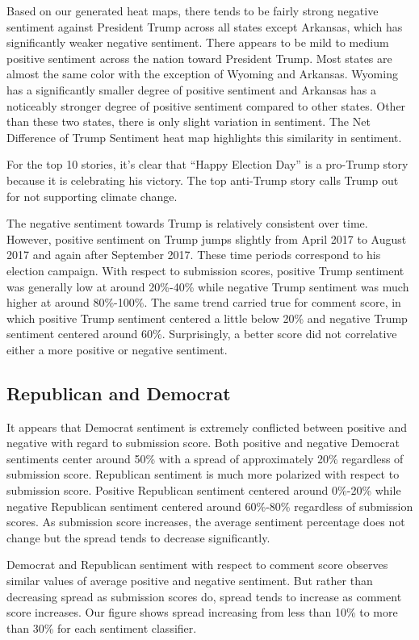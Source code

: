 \documentclass[12pt]{article}
\begin{document}
Based on our generated heat maps, there tends to be fairly strong negative sentiment against President
Trump across all states except Arkansas, which has significantly weaker negative sentiment.
There appears to be mild to medium positive sentiment across the nation toward President
Trump. Most states are almost the same color with the exception of Wyoming and Arkansas. Wyoming has a
significantly smaller degree of positive sentiment and Arkansas has a noticeably stronger degree of positive
sentiment compared to other states. Other than these two states, there is only slight variation in sentiment.
The Net Difference of Trump Sentiment heat map highlights this similarity in sentiment.

For the top 10 stories, it’s clear that ``Happy Election Day'' is a pro-Trump story because it is celebrating
his victory. The top anti-Trump story calls Trump out for not supporting climate change.

The negative sentiment towards Trump is relatively consistent over time. However, positive sentiment on Trump jumps slightly
from April 2017 to August 2017 and again after September 2017. These time periods correspond to his election campaign.
With respect to submission scores, positive Trump sentiment was generally low at around 20\%-40\% while negative
Trump sentiment was much higher at around 80\%-100\%. The same trend carried true for comment score, in which
positive Trump sentiment centered a little below 20\% and negative Trump sentiment centered around 60\%.
Surprisingly, a better score did not correlative either a more positive or negative sentiment.

\subsection{Republican and Democrat}

It appears that Democrat sentiment is extremely conflicted between positive and negative with regard to submission score.
Both positive and negative Democrat sentiments center around 50\% with a spread of approximately 20\% regardless of submission score.
Republican sentiment is much more polarized with respect to submission score. Positive Republican sentiment centered around 0\%-20\%
while negative Republican sentiment centered around 60\%-80\% regardless of submission scores. As submission score increases,
the average sentiment percentage does not change but the spread tends to decrease significantly.

Democrat and Republican sentiment with respect to comment score observes similar values of average positive and negative
sentiment. But rather than decreasing spread as submission scores do, spread tends to increase as comment score increases.
Our figure shows spread increasing from less than 10\% to more than 30\% for each sentiment classifier.
\end{document}
